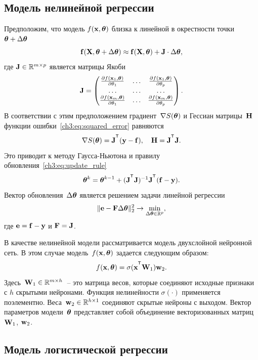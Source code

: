 \subsection*{Модель нелинейной регрессии}
Предположим, что модель $f (\mathbf{x} , \boldsymbol{\theta})$ близка к линейной в окрестности точки $\boldsymbol{\theta} + \Delta \boldsymbol{\theta}$
\[
\mathbf{f}(\mathbf{X} , \boldsymbol{\theta} + \Delta \boldsymbol{\theta}) \approx \mathbf{f}(\mathbf{X} , \boldsymbol{\theta}) + \mathbf{J} \cdot \Delta  \boldsymbol{\theta},
\]
где $\mathbf{J} \in \mathbb{R}^{m \times p}$ является матрицы Якоби
\begin{equation}
\mathbf{J} = 
\begin{pmatrix}
\frac{\partial f(\mathbf{x}_1 , \boldsymbol{\theta})}{\partial \theta_1} & \dots & 
\frac{\partial f(\mathbf{x}_1 , \boldsymbol{\theta})}{\partial \theta_p} \\
\dots & \dots & \dots \\
\frac{\partial f(\mathbf{x}_m , \boldsymbol{\theta})}{\partial \theta_1} & \dots & 
\frac{\partial f(\mathbf{x}_m , \boldsymbol{\theta})}{\partial \theta_p}
\end{pmatrix}.
\end{equation}
В соответствии с этим предположением градиент~$\nabla S(\boldsymbol{\theta})$ и Гессиан матрицы~$\mathbf{H}$ функции ошибки~\eqref{ch3:eq:squared_error} равняются
\begin{equation}
\nabla S(\btheta) = \bJ^{\T} (\by - \mathbf{f}), \quad \bH = \bJ^{\T} \bJ.
\label{ch3:eq:nonlin_reg_deriv}
\end{equation}
Это приводит к методу Гаусса-Ньютона и правилу обновления~\eqref{ch3:eq:update_rule}
\[
\btheta^k = \btheta^{k - 1} + (\bJ^{\T} \bJ)^{-1}\bJ^{\T}(\mathbf{f} - \by).
\]
Вектор обновления~$\Delta \boldsymbol{\theta}$ является решением задачи линейной регрессии
\begin{equation}
\| \mathbf{e} - \mathbf{F} \Delta \boldsymbol{\theta} \|_2^2 \rightarrow \min_{\Delta \boldsymbol{\theta} \in \mathbb{R}^{p}},
\label{ch3:eq:lin_reg_nonlin_reg}
\end{equation}
где $\mathbf{e} = \mathbf{f} - \mathbf{y}$ и $\mathbf{F} = \mathbf{J}$.

В качестве нелинейной модели рассматривается модель двухслойной нейронной сеть. В этом случае модель~$f (\mathbf{x}, \boldsymbol{\theta})$ задается
следующим образом:
\[
f(\bx, \btheta) = \sigma(\bx^{\T} \bW_1) \bw_2.
\]
Здесь~$\mathbf{W}_1 \in \mathbb{R}^{m \times h}$~-- это матрица весов, которые соединяют исходные признаки с $h$ скрытыми нейронами. Функция нелинейности $\sigma(\cdot)$ применяется поэлементно. Веса~$\mathbf{w}_2 \in \mathbb{R}^{h \times 1}$ соединяют скрытые нейроны с выходом. 
Вектор параметров модели~$\boldsymbol{\theta}$ представляет собой объединение векторизованных матриц~$\mathbf{W}_1$, $\mathbf{w}_2$.

\subsection*{Модель логистической регрессии}

